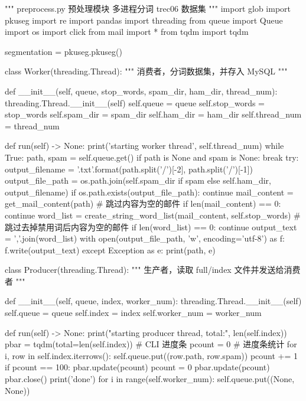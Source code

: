 \documentclass[UTF8,zihao=-4]{ctexart}
\begin{document}
\begin{python}
"""
preprocess.py
预处理模块
多进程分词 trec06 数据集
"""
import glob
import pkuseg
import re
import pandas
import threading
from queue import Queue
import os
import click
from mail import *
from tqdm import tqdm

segmentation = pkuseg.pkuseg()


class Worker(threading.Thread):
    """
    消费者，分词数据集，并存入 MySQL
    """

    def __init__(self, queue, stop_words, spam_dir, ham_dir, thread_num):
        threading.Thread.__init__(self)
        self.queue = queue
        self.stop_words = stop_words
        self.spam_dir = spam_dir
        self.ham_dir = ham_dir
        self.thread_num = thread_num

    def run(self) -> None:
        print('starting worker thread', self.thread_num)
        while True:
            path, spam = self.queue.get()
            if path is None and spam is None:
                break
            try:
                output_filename = '{}{}.txt'.format(path.split('/')[-2], path.split('/')[-1])
                output_file_path = os.path.join(self.spam_dir if spam else self.ham_dir, output_filename)
                if os.path.exists(output_file_path):
                    continue
                mail_content = get_mail_content(path)
                # 跳过内容为空的邮件
                if len(mail_content) == 0:
                    continue
                word_list = create_string_word_list(mail_content, self.stop_words)
                # 跳过去掉禁用词后内容为空的邮件
                if len(word_list) == 0:
                    continue
                output_text = ','.join(word_list)
                with open(output_file_path, 'w', encoding='utf-8') as f:
                    f.write(output_text)
            except Exception as e:
                print(path, e)


class Producer(threading.Thread):
    """
    生产者，读取 full/index 文件并发送给消费者
    """

    def __init__(self, queue, index, worker_num):
        threading.Thread.__init__(self)
        self.queue = queue
        self.index = index
        self.worker_num = worker_num

    def run(self) -> None:
        print("starting producer thread, total:", len(self.index))
        pbar = tqdm(total=len(self.index))  # CLI 进度条
        pcount = 0  # 进度条统计
        for i, row in self.index.iterrows():
            self.queue.put((row.path, row.spam))
            pcount += 1
            if pcount == 100:
                pbar.update(pcount)
                pcount = 0
        pbar.update(pcount)
        pbar.close()
        print('done')
        for i in range(self.worker_num):
            self.queue.put((None, None))



\end{python}
\end{document}
